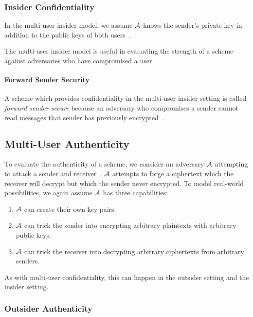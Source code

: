 \subsubsection{Insider Confidentiality}\label{subsubsec:sec-conf-insider}

In the multi-user insider model, we assume $\mathcal{A}$ knows the sender's private key in addition to the public keys of
both users~\cite[p. 45--46]{baek2010}\@.

The multi-user insider model is useful in evaluating the strength of a scheme against adversaries who have compromised
a user.

\paragraph{Forward Sender Security}

A scheme which provides confidentiality in the multi-user insider setting is called \emph{forward sender secure} because
an adversary who compromises a sender cannot read messages that sender has previously encrypted~\cite{canetti2003}\@.

\subsection{Multi-User Authenticity}\label{subsec:sec-auth}

To evaluate the authenticity of a scheme, we consider an adversary $\mathcal{A}$ attempting to attack a sender and
receiver~\cite[p. 47]{baek2010}\@.
$\mathcal{A}$ attempts to forge a ciphertext which the receiver will decrypt but which the sender never encrypted.
To model real-world possibilities, we again assume $\mathcal{A}$ has three capabilities:

\begin{enumerate}
    \item $\mathcal{A}$ can create their own key pairs.
    \item $\mathcal{A}$ can trick the sender into encrypting arbitrary plaintexts with arbitrary public keys.
    \item $\mathcal{A}$ can trick the receiver into decrypting arbitrary ciphertexts from arbitrary senders.
\end{enumerate}

As with multi-user confidentiality, this can happen in the outsider setting and the insider setting.

\subsubsection{Outsider Authenticity}\label{subsubsec:sec-auth-outsider}

